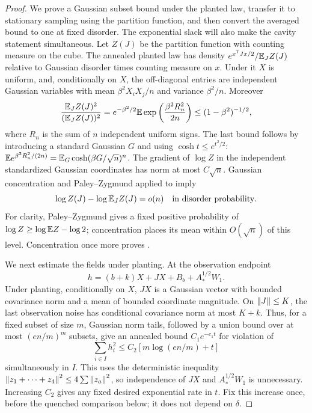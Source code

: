\begin{proof}
We prove a Gaussian subset bound under the planted law, transfer it to
stationary sampling using the partition function, and then convert the
averaged bound to one at fixed disorder.  The exponential slack will also
make the cavity statement simultaneous.  Let $Z(J)$
be the partition function with counting measure on the cube.  The annealed
planted law has density
$e^{x^{\mathsf T}Jx/2}/\mathbb E_J Z(J)$ relative to Gaussian disorder times
counting measure on $x$.  Under it $X$ is uniform, and, conditionally on
$X$, the off-diagonal entries are independent Gaussian variables with mean
$\beta^2X_iX_j/n$ and variance $\beta^2/n$.  Moreover
\begin{equation}\label{eq:stat-Z-moment}
 \frac{\mathbb E_J Z(J)^2}{(\mathbb E_J Z(J))^2}
 =e^{-\beta^2/2}\mathbb E\exp\left(\frac{\beta^2 R_n^2}{2n}\right)
 \le(1-\beta^2)^{-1/2},
\end{equation}
where $R_n$ is the sum of $n$ independent uniform signs.  The last bound
follows by introducing a standard Gaussian $G$ and using
$\cosh t\le e^{t^2/2}$:
$\mathbb E e^{\beta^2R_n^2/(2n)}=\mathbb E_G\cosh(\beta G/\sqrt n)^n$.
The gradient of $\log Z$ in the independent standardized Gaussian
coordinates has norm at most $C\sqrt n$.  Gaussian concentration and
Paley--Zygmund applied to  imply
\begin{equation}\label{eq:stat-Z-comparison}
 \log Z(J)-\log\mathbb E_JZ(J)=o(n)
       \quad\hbox{in disorder probability}.
\end{equation}
For clarity, Paley--Zygmund gives a fixed positive probability of
$\log Z\ge\log\mathbb E Z-\log2$; concentration places its mean within
$O(\sqrt n)$ of this level.  Concentration once more proves
.

We next estimate the fields under planting.  At the observation endpoint
\[
 h=(b+k)X+JX+B_b+A_*^{1/2}W_1.
\]
Under planting, conditionally on $X$, $JX$ is a Gaussian vector with
bounded covariance norm and a mean of bounded coordinate magnitude.
On $\left\lVert J\right\rVert\le K$, the last observation noise has conditional covariance
norm at most $K+k$.  Thus, for a fixed subset of size $m$, Gaussian norm
tails, followed by a union bound over at most $(en/m)^m$ subsets, give
an annealed bound $C_1e^{-c_1t}$ for violation of
\[
 \sum_{i\in I}h_i^2\le C_2[m\log(en/m)+t]
\]
simultaneously in $I$.  This uses the deterministic inequality
$\left\lVert z_1+\cdots+z_4\right\rVert^2\le4\sum\left\lVert z_a\right\rVert^2$, so independence of
$JX$ and $A_*^{1/2}W_1$ is unnecessary.  Increasing $C_2$ gives any
fixed desired exponential rate in $t$. Fix this increase once, before the
quenched comparison below; it does not depend on $\delta$.


\end{proof}
